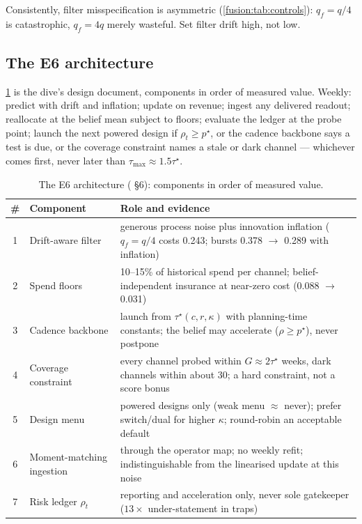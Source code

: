 Consistently, filter misspecification is asymmetric (\cref{fusion:tab:controls}): $q_f = q/4$ is catastrophic, $q_f = 4q$ merely wasteful. Set filter drift high, not low.

\subsection{The E6 architecture}

\cref{fusion:tab:arch} is the dive's design document, components in order of measured value. Weekly: predict with drift and inflation; update on revenue; ingest any delivered readout; reallocate at the belief mean subject to floors; evaluate the ledger at the probe point; launch the next powered design if $\rho_t \ge p^\star$, or the cadence backbone says a test is due, or the coverage constraint names a stale or dark channel --- whichever comes first, never later than $\tau_{\max} \approx 1.5\tau^\star$.

\begin{table}[htbp]
\centering\small
\caption{The E6 architecture ( \S6): components in order of measured value.}
\label{fusion:tab:arch}
\begin{tabularx}{\textwidth}{clX}
\toprule
\# & Component & Role and evidence \\
\midrule
1 & Drift-aware filter & generous process noise plus innovation inflation ($q_f = q/4$ costs 0.243; bursts 0.378 $\to$ 0.289 with inflation) \\
2 & Spend floors & 10--15\% of historical spend per channel; belief-independent insurance at near-zero cost (0.088 $\to$ 0.031) \\
3 & Cadence backbone & launch from $\tau^\star(c,r,\kappa)$ with planning-time constants; the belief may accelerate ($\rho \ge p^\star$), never postpone \\
4 & Coverage constraint & every channel probed within $G \approx 2\tau^\star$ weeks, dark channels within about 30; a hard constraint, not a score bonus \\
5 & Design menu & powered designs only (weak menu $\approx$ never); prefer switch/dual for higher $\kappa$; round-robin an acceptable default \\
6 & Moment-matching ingestion & through the operator map; no weekly refit; indistinguishable from the linearised update at this noise \\
7 & Risk ledger $\rho_t$ & reporting and acceleration only, never sole gatekeeper ($13\times$ under-statement in traps) \\
\bottomrule
\end{tabularx}
\end{table}

